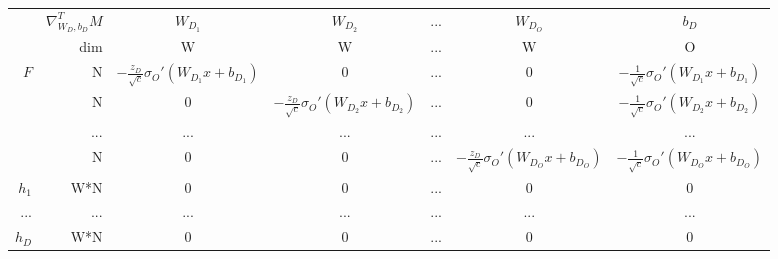 \begin{table}[p]
\begin{subtable}{\textwidth}
{\begin{tabular}{r r | c c c c c}
& $\nabla^T_{W_D,b_D}M$ & $W_{D_1}$ &  $W_{D_2}$  &...&  $W_{D_O}$ & $b_D$ \\
& dim & W & W &...& W & O \\ \hline
$F$ & N & $-\frac{z_D}{\sqrt{c}}\sigma_O'(W_{D_1}x+b_{D_1})$ & 0 &...& 0 & $-\frac{1}{\sqrt{c}}\sigma_O'(W_{D_1}x+b_{D_1})$ \\
    & N & 0 & $-\frac{z_D}{\sqrt{c}}\sigma_O'(W_{D_2}x+b_{D_2})$ &...& 0 & $-\frac{1}{\sqrt{c}}\sigma_O'(W_{D_2}x+b_{D_2})$ \\
      &...&...&...&...&...&... \\
    & N & 0 & 0 &...& $-\frac{z_D}{\sqrt{c}}\sigma_O'(W_{D_O}x+b_{D_O})$ & $-\frac{1}{\sqrt{c}}\sigma_O'(W_{D_O}x+b_{D_O})$ \\ \hline
$h_1$ & W*N & 0 & 0 &...& 0 & 0 \\
...   & ... &...&...&...&...&...\\ 
$h_{D}$ & W*N & 0 & 0 &...& 0 & 0 \\ \hline
      
\end{tabular}}
\end{subtable}



\end{table}
